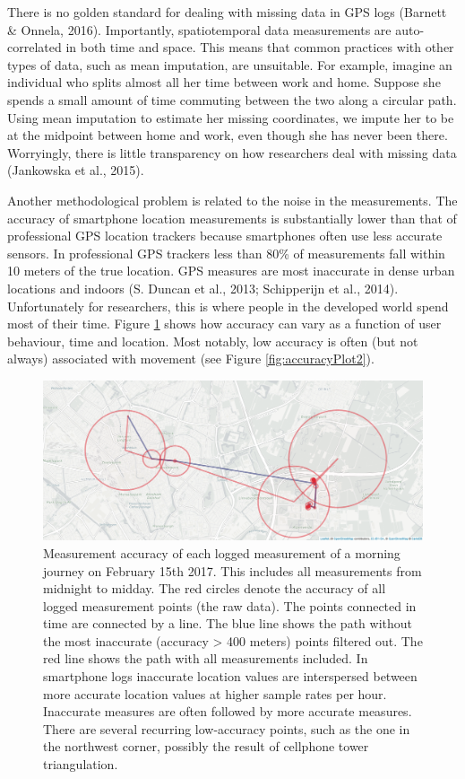 \documentclass[man]{apa6}
\theoremstyle{definition}
\theoremstyle{definition}
\theoremstyle{definition}
\theoremstyle{remark}
\begin{document}
There is no golden standard for dealing with missing data in GPS logs
(Barnett \& Onnela, 2016). Importantly, spatiotemporal data measurements
are auto-correlated in both time and space. This means that common
practices with other types of data, such as mean imputation, are
unsuitable. For example, imagine an individual who splits almost all her
time between work and home. Suppose she spends a small amount of time
commuting between the two along a circular path. Using mean imputation
to estimate her missing coordinates, we impute her to be at the midpoint
between home and work, even though she has never been there. Worryingly,
there is little transparency on how researchers deal with missing data
(Jankowska et al., 2015).

Another methodological problem is related to the noise in the
measurements. The accuracy of smartphone location measurements is
substantially lower than that of professional GPS location trackers
because smartphones often use less accurate sensors. In professional GPS
trackers less than 80\% of measurements fall within 10 meters of the
true location. GPS measures are most inaccurate in dense urban locations
and indoors (S. Duncan et al., 2013; Schipperijn et al., 2014).
Unfortunately for researchers, this is where people in the developed
world spend most of their time. Figure \ref{fig:accuracyPlot} shows how
accuracy can vary as a function of user behaviour, time and location.
Most notably, low accuracy is often (but not always) associated with
movement (see Figure \ref{fig:accuracyPlot2}).

\begin{figure}
\includegraphics[width=1\linewidth]{img/journeyTillMiddayBoaz} \caption{Measurement accuracy of each logged measurement of a morning journey on February 15th 2017. This includes all measurements from midnight to midday. The red circles denote the accuracy of all logged measurement points (the raw data). The points connected in time are connected by a line. The blue line shows the path without the most inaccurate (accuracy > 400 meters) points filtered out. The red line shows the path with all measurements included. In smartphone logs inaccurate location values are interspersed between more accurate location values at higher sample rates per hour. Inaccurate measures are often followed by more accurate measures. There are several recurring low-accuracy points, such as the one in the northwest corner, possibly the result of cellphone tower triangulation.}\label{fig:accuracyPlot}
\end{figure}
\end{document}
